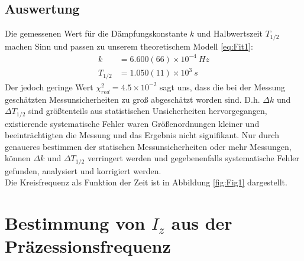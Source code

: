 \documentclass[a4paper,10pt]{article}
\begin{document}
\subsection{Auswertung}
Die gemessenen Wert für die Dämpfungskonstante \(k\) und Halbwertszeit \(T_{1/2}\) machen Sinn und passen zu unserem theoretischem Modell \eqref{eq:Fit1}:
\begin{align*}
k&=6.600(66)\times10^{-4}\: Hz\\
T_{1/2}&=1.050(11)\times10^{3}\:s
\end{align*}
Der jedoch geringe Wert \(\chi^{2}_{red}=4.5\times10^{-2}\) sagt uns, dass die bei der Messung geschätzten Messunsicherheiten zu groß abgeschätzt worden sind. D.h.  \(\Delta k\) und \(\Delta T_{1/2}\) sind größtenteils aus statistischen Unsicherheiten hervorgegangen, existierende systematische Fehler waren Größenordnungen kleiner und beeinträchtigten die Messung und das Ergebnis nicht signifikant. Nur durch genaueres bestimmen der statischen Messunsicherheiten oder mehr Messungen, können \(\Delta k\) und \(\Delta T_{1/2}\) verringert werden und gegebenenfalls systematische Fehler gefunden, analysiert und korrigiert werden.\\
Die Kreisfrequenz als Funktion der Zeit ist in Abbildung \ref{fig:Fig1} dargestellt.\\
\section{Bestimmung von \(I_{z}\) aus der Präzessionsfrequenz}
\end{document}
